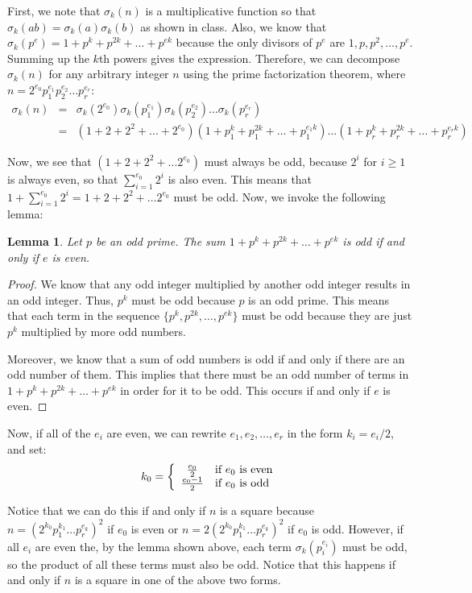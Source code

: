 \documentclass[psamsfonts]{amsart}
\newtheorem{lem}[thm]{Lemma}
\newenvironment{sol}{{\bfseries Solution}}{\qedsymbol}
\theoremstyle{definition}
\theoremstyle{remark}
\numberwithin{equation}{section}
\begin{document}
\begin{sol}
First, we note that $\sigma_k(n)$ is a multiplicative function so that $\sigma_k(ab) = \sigma_k(a) \sigma_k(b)$ as shown in class. Also, we know that $\sigma_k(p^e) = 1 + p^k + p^{2k} + \ldots + p^{ek}$ because the only divisors of $p^e$ are $1, p, p^2, \ldots, p^e$. Summing up the $k$th powers gives the expression. Therefore, we can decompose $\sigma_k(n)$ for any arbitrary integer $n$ using the prime factorization theorem, where $n = 2^{e_0} p_1^{e_1} p_2^{e_2} \ldots p_r^{e_r}$:
\begin{eqnarray}
\sigma_k(n) &=& \sigma_k(2^{e_0}) \sigma_k(p_1^{e_1}) \sigma_k(p_2^{e_2}) \ldots \sigma_k(p_r^{e_r}) \\
&=& (1 + 2 + 2^2 + \ldots + 2^{e_0}) ( 1 + p_1^k + p_1^{2k} + \ldots + p_1^{e_1 k} ) \ldots \left( 1 + p_r^k + p_r^{2k} + \ldots + p_r^{e_r k} \right)
\end{eqnarray}

Now, we see that $(1 + 2 + 2^2 + \ldots 2^{e_0})$ must always be odd, because $2^i$ for $i \geq 1$ is always even, so that $\sum_{i=1}^{e_0} 2^i$ is also even. This means that $1 + \sum_{i=1}^{e_0} 2^i = 1 + 2 + 2^2 + \ldots 2^{e_0} $ must be odd. Now, we invoke the following lemma:

\begin{lem}
Let $p$ be an odd prime. The sum $1 + p^k + p^{2k} + \ldots + p^{e k}$ is odd if and only if $e$ is even. 
\end{lem}

\begin{proof}
We know that any odd integer multiplied by another odd integer results in an odd integer. Thus, $p^k$ must be odd because $p$ is an odd prime. This means that each term in the sequence $\{p^k, p^{2k}, \ldots, p^{e k} \}$ must be odd because they are just $p^k$ multiplied by more odd numbers. 

Moreover, we know that a sum of odd numbers is odd if and only if there are an odd number of them. This implies that there must be an odd number of terms in $1 + p^k + p^{2k} + \ldots + p^{e k}$ in order for it to be odd. This occurs if and only if $e$ is even.
\end{proof}

Now, if all of the $e_i$ are even, we can rewrite $e_1, e_2, \ldots, e_r$ in the form $k_i = e_i / 2$, and set:
\begin{equation}
k_0 = \left\{ \begin{array}{c l}
\frac{e_0}{2} & \textrm{if } e_0 \textrm{ is even} \\
\frac{e_0 - 1}{2} & \textrm{if } e_0 \textrm{ is odd} 
\end{array} \right.
\end{equation}

Notice that we can do this if and only if $n$ is a square because $n = (2^{k_0} p_1^{k_1} \ldots p_r^{e_k})^2$ if $e_0$ is even or $n = 2 (2^{k_0} p_1^{k_1} \ldots p_r^{e_k})^2$ if $e_0$ is odd. However, if all $e_i$ are even the, by the lemma shown above, each term $\sigma_k(p_i^{e_i})$ must be odd, so the product of all these terms must also be odd. Notice that this happens if and only if $n$ is a square in one of the above two forms. 
\end{sol}
\end{document}
